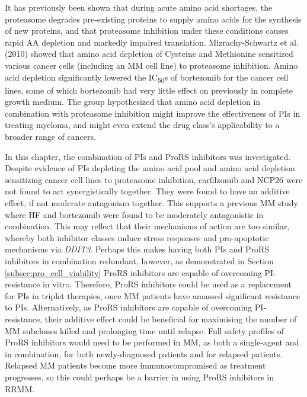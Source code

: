 It has previously been shown that during acute amino acid shortages, the proteasome degrades pre-existing proteins to supply amino acids for the synthesis of new proteins, and that proteasome inhibition under these conditions causes rapid AA depletion and markedly impaired translation\cite{vabulas2005protein}.
Mizrachy-Schwartz et al. (2010) showed that amino acid depletion of Cysteine and Methionine sensitized various cancer cells (including an MM cell line) to proteasome inhibition\cite{mizrachy2010amino}.
Amino acid depletion significantly lowered the IC\textsubscript{50}s of bortezomib for the cancer cell lines, some of which bortezomib had very little effect on previously in complete growth medium.
The group hypothesized that amino acid depletion in combination with proteasome inhibition might improve the effectiveness of PIs in treating myeloma, and might even extend the drug class's applicability to a broader range of cancers.

In this chapter, the combination of PIs and ProRS inhibitors was investigated.
Despite evidence of PIs depleting the amino acid pool and amino acid depletion sensitizing cancer cell lines to proteasome inhibition\cite{suraweera2012failure, mizrachy2010amino}, carfilzomib and NCP26 were not found to act synergistically together.
They were found to have an additive effect, if not moderate antagonism together.
This supports a previous MM study where HF and bortezomib were found to be moderately antagonistic in combination\cite{leiba2012halofuginone}.
This may reflect that their mechanisms of action are too similar, whereby both inhibitor classes induce stress responses and pro-apoptotic mechanisms via \textit{DDIT3}.
Perhaps this makes having both PIs and ProRS inhibitors in combination redundant, however, as demonstrated in Section \ref{subsec:pro_cell_viability} ProRS inhibitors are capable of overcoming PI-resistance in vitro.
Therefore, ProRS inhibitors could be used as a replacement for PIs in triplet therapies, once MM patients have amassed significant resistance to PIs.
Alternatively, as ProRS inhibitors are capable of overcoming PI-resistance, their additive effect could be beneficial for maximising the number of MM subclones killed and prolonging time until relapse.
Full safety profiles of ProRS inhibitors would need to be performed in MM, as both a single-agent and in combination, for both newly-diagnosed patients and for relapsed patients.
Relapsed MM patients become more immunocompromised as treatment progresses, so this could perhaps be a barrier in using ProRS inhibitors in RRMM\@.

